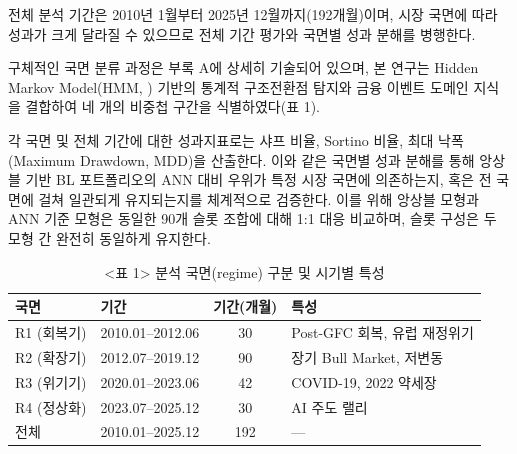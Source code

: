 \documentclass{article}
\begin{document}
전체 분석 기간은 2010년 1월부터 2025년 12월까지(192개월)이며, 시장 국면에 따라 성과가 크게 달라질 수 있으므로 전체 기간 평가와 국면별 성과 분해를 병행한다.

구체적인 국면 분류 과정은 부록 A에 상세히 기술되어 있으며, 본 연구는 Hidden Markov Model(HMM, \citealp{hamilton1989new}) 기반의 통계적 구조전환점 탐지와 금융 이벤트 도메인 지식을 결합하여 네 개의 비중첩 구간을 식별하였다(표 1).

각 국면 및 전체 기간에 대한 성과지표로는 샤프 비율, Sortino 비율, 최대 낙폭(Maximum Drawdown, MDD)을 산출한다. 이와 같은 국면별 성과 분해를 통해 앙상블 기반 BL 포트폴리오의 ANN 대비 우위가 특정 시장 국면에 의존하는지, 혹은 전 국면에 걸쳐 일관되게 유지되는지를 체계적으로 검증한다. 이를 위해 앙상블 모형과 ANN 기준 모형은 동일한 90개 슬롯 조합에 대해 1:1 대응 비교하며, 슬롯 구성은 두 모형 간 완전히 동일하게 유지한다.

\begin{table}[ht]
\centering
\caption{<표 1> 분석 국면(regime) 구분 및 시기별 특성}
\label{tab:regimes}
\begin{tabular}{llcl}
\toprule
국면 & 기간 & 기간(개월) & 특성 \\
\midrule
R1 (회복기)  & 2010.01--2012.06 & 30 & Post-GFC 회복, 유럽 재정위기 \\
R2 (확장기)  & 2012.07--2019.12 & 90 & 장기 Bull Market, 저변동 \\
R3 (위기기)  & 2020.01--2023.06 & 42 & COVID-19, 2022 약세장 \\
R4 (정상화)  & 2023.07--2025.12 & 30 & AI 주도 랠리 \\
\midrule
\multicolumn{1}{l}{전체} & 2010.01--2025.12 & 192 & --- \\
\bottomrule
\end{tabular}
\end{table}
\end{document}
